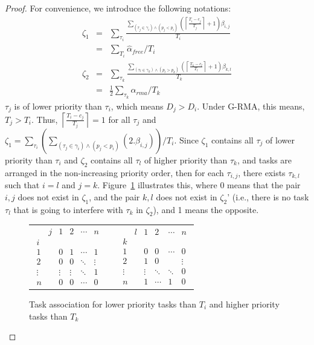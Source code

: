 \documentclass{sig-alternate}
\providecommand{\tabularnewline}{\\}
\begin{document}
\begin{proof}
For convenience, we introduce the following notations:
\begin{eqnarray}
\zeta_{1}& = & \sum_{\tau_{i}}\frac{\sum_{\left(\tau_{j}\in\gamma_{i}\right)\wedge\left(p_{j}<p_{i}\right)}\left(\left\lceil\frac{T_{i}-c_{j}}{T_{j}}\right\rceil+1\right)\beta_{i,j}}{T_{i}}\nonumber\\
& = & \sum_{T_i} \hat{\alpha}_{free}/T_i
\nonumber\\
\zeta_{2} 
& = & \sum_{\tau_{k}}\frac{\sum_{\left(\tau_{l}\in\gamma_{k}\right)\wedge\left(p_{l}>p_{k}\right)}\left(\left\lceil\frac{T_{k}-c_{l}}{T_{l}}\right\rceil+1\right)\beta_{k,l}}{T_{k}}\nonumber\\
& = & \frac{1}{2}\sum_{\tau_k} \alpha_{rma}/T_k\nonumber
\end{eqnarray}
$\tau_{j}$ is of lower priority than $\tau_{i}$, which means $D_{j}>D_{i}$. Under G-RMA, this means, $T_{j}>T_{i}$.
Thus, $\left\lceil\frac{T_{i}-c_{j}}{T_{j}}\right\rceil=1$ for
all $\tau_{j}$ and $\zeta_{1}=\sum_{\tau_{i}}(\sum_{(\tau_{j}\in\gamma_{i})\wedge(p_{j}<p_{i})}(2.\beta_{i,j}))/T_{i}$.
Since $\zeta_{1}$ contains all $\tau_{j}$ of lower priority than
$\tau_{i}$ and $\zeta_{2}$ contains all $\tau_{l}$ of higher priority than $\tau_{k}$, 
and tasks are arranged in the non-increasing priority order, then for each $\tau_{i,j}$, there exists $\tau_{k,l}$ such
that $i=l$ and $j=k$. Figure~\ref{fig:matrix-example} illustrates this, where 0 means that the pair $i,j$ 
does not exist in $\zeta_{1}$,
and the pair $k,l$ does not exist in $\zeta_{2}$' (i.e., 
there is no task $\tau_l$ that is going to interfere with $\tau_k$ in $\zeta_2$), 
and 1 means the opposite. 

\begin{figure}[htbp]
\begin{tabular}{ccc}
$\begin{array}{cccccc}
 & j & 1 & 2 & \cdots & n\\
i\\
1 &  & 0 & 1 & \cdots & 1\\
2 &  & 0 & 0 & \ddots & \vdots\\
\vdots &  & \vdots & \vdots & \ddots & 1\\
n &  & 0 & 0 & \cdots & 0\end{array}$ &  & $\begin{array}{cccccc}
 & l & 1 & 2 & \cdots & n\\
k\\
1 &  & 0 & 0 & \cdots & 0\\
2 &  & 1 & 0 &  & \vdots\\
\vdots &  & \vdots & \ddots & \ddots & 0\\
n &  & 1 & \cdots & 1 & 0\end{array}$\tabularnewline
\end{tabular}
\caption{\label{fig:matrix-example} Task association for lower priority tasks than $T_i$ and higher priority tasks than $T_k$}
\end{figure}


\end{proof}
\end{document}
